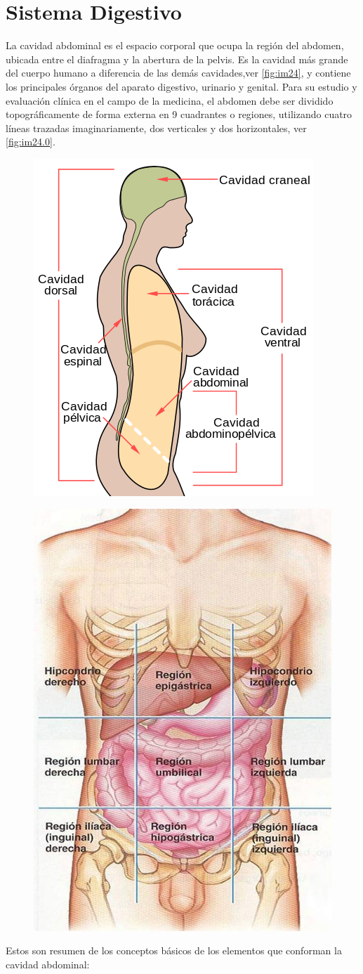 \section{Sistema Digestivo}
La cavidad abdominal es el espacio corporal que ocupa la región del abdomen, ubicada entre el diafragma y la abertura de la pelvis. 
Es la cavidad más grande del cuerpo humano 
a diferencia de las demás cavidades,ver \ref{fig:im24}, y 
contiene los principales órganos del aparato digestivo, urinario y genital.
Para su estudio y evaluación clínica en el campo de la medicina, 
el abdomen debe ser dividido topográficamente de forma externa en 9 
cuadrantes o regiones, utilizando cuatro líneas 
trazadas imaginariamente, dos verticales y dos horizontales, ver \ref{fig:im24.0}.\cite{web12}
\begin{figure}
 \begin{center}
  \includegraphics[width = .3\textwidth]{source/images/image56.png}
 \end{center} 
\end{figure}
\begin{figure}[H]
	\begin{center}
 		\includegraphics[width = .3\textwidth]{v3/images/image1.jpg}
	\end{center} 
\end{figure}
Estos son resumen de los conceptos básicos de los elementos que conforman la cavidad abdominal\cite{pro2012anatomia}:
